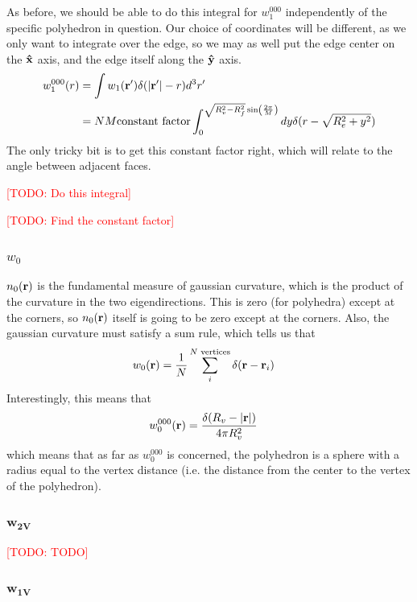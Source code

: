 \documentclass[letterpaper,twocolumn,amsmath,amssymb,pre]{revtex4-1}
\newcommand{\todo}[1]{\textcolor{red}{[TODO: #1]}}
\begin{document}
As before, we should be able to do this integral for $w_1^{000}$
independently of the specific polyhedron in question.  Our choice of
coordinates will be different, as we only want to integrate over the
edge, so we may as well put the edge center on the $\mathbf{\hat{x}}$ axis, and
the edge itself along the $\mathbf{\hat{y}}$ axis.
\begin{align}
  w_1^{000}(r) &= \int w_1(\mathbf{r}') \delta(|\mathbf{r}'|-r) d^3r'
  \\
  &= NM \text{constant factor}
  \int_0^{\sqrt{R_v^2-R_f^2}\sin\left(\frac{2\pi}{M}\right)} dy
  \delta(r - \sqrt{R_e^2 + y^2})
\end{align}
The only tricky bit is to get this constant factor right, which will
relate to the angle between adjacent faces.

\todo{Do this integral}

\todo{Find the constant factor}

\subsubsection{$w_0$}

$n_0(\mathbf{r})$ is the fundamental measure of gaussian curvature, which is
the product of the curvature in the two eigendirections.  This is zero
(for polyhedra) except at the corners, so $n_0(\mathbf{r})$ itself is going
to be zero except at the corners.  Also, the gaussian curvature
must satisfy a sum rule, which tells us that
\begin{align}
  w_0(\mathbf{r}) &= \frac1{N}\sum_{i}^{N\text{ vertices}} \delta(\mathbf{r}-\mathbf{r}_i)
\end{align}
Interestingly, this means that
\begin{align}
  w_0^{000}(\mathbf{r}) &= \frac{\delta(R_v - |\mathbf{r}|)}{4\pi R_v^2}
\end{align}
which means that as far as $w_0^{000}$ is concerned, the polyhedron is a
sphere with a radius equal to the vertex distance (i.e. the distance
from the center to the vertex of the polyhedron).

\subsubsection{$\mathbf{w_{2V}}$}

\todo{TODO}

\subsubsection{$\mathbf{w_{1V}}$}
\end{document}
